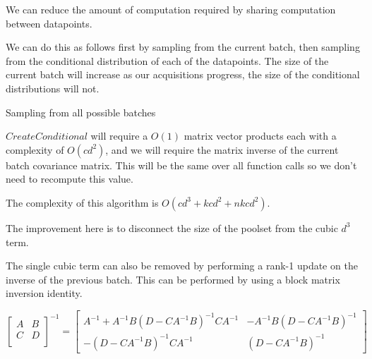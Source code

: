 \documentclass[12pt, a4paper]{report}
\theoremstyle{definition}
\theoremstyle{definition}
\theoremstyle{definition}
\begin{document}
We can reduce the amount of computation required by sharing computation between datapoints.

We can do this as follows first by sampling from the current batch, then sampling from the conditional distribution of each of the datapoints. The size of the current batch will increase as our acquisitions progress, the size of the conditional distributions will not.


\begin{algorithm}[H]
    \SetAlgoLined
     \caption{Sampling from all possible batches}
\end{algorithm}

$CreateConditional$ will require a $O(1)$ matrix vector products each with a complexity of $O(cd^2)$, and we will require the matrix inverse of the current batch covariance matrix. This will be the same over all function calls so we don't need to recompute this value.

The complexity of this algorithm is $O\left(cd^3 + kcd^2 + nkcd^2 \right)$.

The improvement here is to disconnect the size of the poolset from the cubic $d^3$ term.

The single cubic term can also be removed by performing a rank-1 update on the inverse of the previous batch. This can be performed by using a block matrix inversion identity.

$$\begin{bmatrix}
    A & B \\
    C & D \\
\end{bmatrix}^{-1} = \begin{bmatrix}
    A^{-1} + A^{-1} B \left(D - C A^{-1} B \right)^{-1} C A^{-1} & -A^{-1} B \left( D - C A^{-1}B\right)^{-1} \\
    - \left(D - CA^{-1}B \right)^{-1} C A^{-1} & \left(D - C A^{-1} B\right)^{-1}
\end{bmatrix} $$ 
\end{document}
